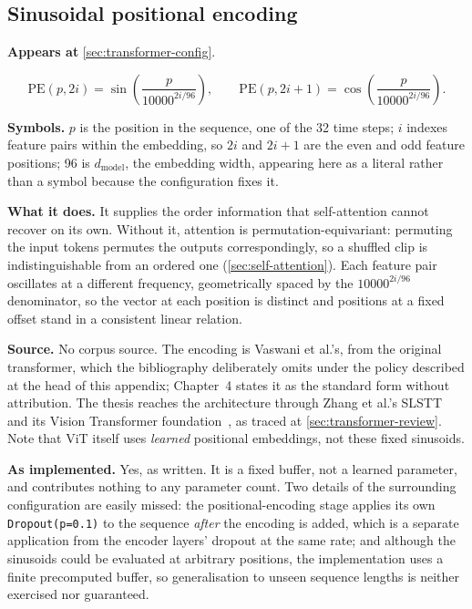 \subsection{Sinusoidal positional encoding}
\label{eq:posenc}

\textbf{Appears at} \autoref{sec:transformer-config}.

\[
	\mathrm{PE}(p, 2i) = \sin\!\left(\frac{p}{10000^{2i/96}}\right), \qquad \mathrm{PE}(p, 2i+1) = \cos\!\left(\frac{p}{10000^{2i/96}}\right).
\]

\textbf{Symbols.} $p$ is the position in the sequence, one of the 32 time
steps; $i$ indexes feature pairs within the embedding, so $2i$ and $2i+1$ are
the even and odd feature positions; 96 is $d_{\text{model}}$, the embedding
width, appearing here as a literal rather than a symbol because the
configuration fixes it.

\textbf{What it does.} It supplies the order information that self-attention
cannot recover on its own. Without it, attention is permutation-equivariant:
permuting the input tokens permutes the outputs correspondingly, so a shuffled
clip is indistinguishable from an ordered one (\autoref{sec:self-attention}).
Each feature pair oscillates at a different frequency, geometrically spaced by
the $10000^{2i/96}$ denominator, so the vector at each position is distinct
and positions at a fixed offset stand in a consistent linear relation.

\textbf{Source.} No corpus source. The encoding is Vaswani et al.'s, from the
original transformer, which the bibliography deliberately omits under the
policy described at the head of this appendix; Chapter~4 states it as the
standard form without attribution. The thesis reaches the architecture through
Zhang et al.'s SLSTT~\cite{zhang2022} and its Vision Transformer
foundation~\cite{dosovitskiy2021}, as traced at
\autoref{sec:transformer-review}. Note that ViT itself uses \emph{learned}
positional embeddings, not these fixed sinusoids.

\textbf{As implemented.} Yes, as written. It is a fixed buffer, not a learned
parameter, and contributes nothing to any parameter count. Two details of the
surrounding configuration are easily missed: the positional-encoding stage
applies its own \texttt{Dropout(p=0.1)} to the sequence \emph{after} the
encoding is added, which is a separate application from the encoder layers'
dropout at the same rate; and although the sinusoids could be evaluated at
arbitrary positions, the implementation uses a finite precomputed buffer, so
generalisation to unseen sequence lengths is neither exercised nor guaranteed.


